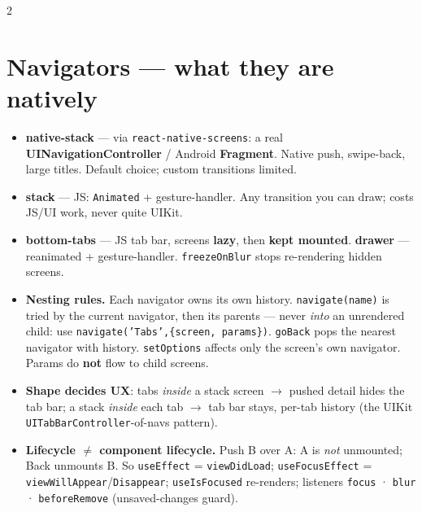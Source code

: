 \documentclass[8pt]{extarticle}
\begin{document}

\begin{multicols}{2}
\raggedright

\section{Navigators — what they are natively}
\begin{itemize}
  \item \textbf{native-stack} — via \texttt{react-native-screens}: a real
        \textbf{UINavigationController} / Android \textbf{Fragment}. Native push,
        swipe-back, large titles. Default choice; custom transitions limited.
  \item \textbf{stack} — JS: \texttt{Animated} + gesture-handler. Any transition you can
        draw; costs JS/UI work, never quite UIKit.
  \item \textbf{bottom-tabs} — JS tab bar, screens \textbf{lazy}, then \textbf{kept
        mounted}. \textbf{drawer} — reanimated + gesture-handler.
        \texttt{freezeOnBlur} stops re-rendering hidden screens.
  \item \textbf{Nesting rules.} Each navigator owns its own history.
        \texttt{navigate(name)} is tried by the current navigator, then its parents —
        never \emph{into} an unrendered child: use
        \texttt{navigate('Tabs',\{screen, params\})}. \texttt{goBack} pops the nearest
        navigator with history. \texttt{setOptions} affects only the screen's own
        navigator. Params do \textbf{not} flow to child screens.
  \item \textbf{Shape decides UX}: tabs \emph{inside} a stack screen $\to$ pushed detail
        hides the tab bar; a stack \emph{inside} each tab $\to$ tab bar stays, per-tab
        history (the UIKit \texttt{UITabBarController}-of-navs pattern).
  \item \textbf{Lifecycle $\ne$ component lifecycle.} Push B over A: A is \emph{not}
        unmounted; Back unmounts B. So \texttt{useEffect} = \texttt{viewDidLoad};
        \texttt{useFocusEffect} = \texttt{viewWillAppear}/\texttt{Disappear};
        \texttt{useIsFocused} re-renders; listeners \texttt{focus} · \texttt{blur} ·
        \texttt{beforeRemove} (unsaved-changes guard).
\end{itemize}


\end{multicols}
\end{document}
